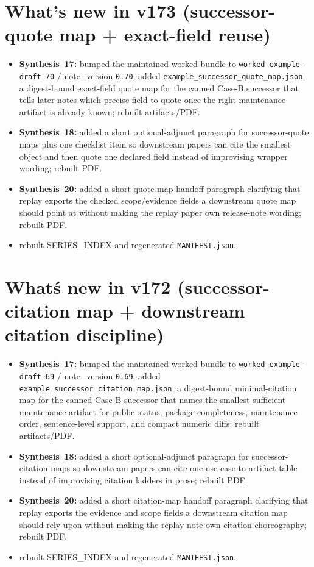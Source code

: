 \documentclass[11pt]{article}
\begin{document}
\section{What's new in v173 (successor-quote map + exact-field reuse)}
\begin{itemize}[leftmargin=*]
\item \textbf{Synthesis~17:} bumped the maintained worked bundle to \texttt{worked-example-draft-70} / note\_version \texttt{0.70}; added \texttt{example\_successor\_quote\_map.json}, a digest-bound exact-field quote map for the canned Case-B successor that tells later notes which precise field to quote once the right maintenance artifact is already known; rebuilt artifacts/PDF.
\item \textbf{Synthesis~18:} added a short optional-adjunct paragraph for successor-quote maps plus one checklist item so downstream papers can cite the smallest object and then quote one declared field instead of improvising wrapper wording; rebuilt PDF.
\item \textbf{Synthesis~20:} added a short quote-map handoff paragraph clarifying that replay exports the checked scope/evidence fields a downstream quote map should point at without making the replay paper own release-note wording; rebuilt PDF.
\item rebuilt SERIES\_INDEX and regenerated \texttt{MANIFEST.json}.
\end{itemize}

\section{What\'s new in v172 (successor-citation map + downstream citation discipline)}
\begin{itemize}[leftmargin=*]
\item \textbf{Synthesis~17:} bumped the maintained worked bundle to \texttt{worked-example-draft-69} / note\_version \texttt{0.69}; added \texttt{example\_successor\_citation\_map.json}, a digest-bound minimal-citation map for the canned Case-B successor that names the smallest sufficient maintenance artifact for public status, package completeness, maintenance order, sentence-level support, and compact numeric diffs; rebuilt artifacts/PDF.
\item \textbf{Synthesis~18:} added a short optional-adjunct paragraph for successor-citation maps so downstream papers can cite one use-case-to-artifact table instead of improvising citation ladders in prose; rebuilt PDF.
\item \textbf{Synthesis~20:} added a short citation-map handoff paragraph clarifying that replay exports the evidence and scope fields a downstream citation map should rely upon without making the replay note own citation choreography; rebuilt PDF.
\item rebuilt SERIES\_INDEX and regenerated \texttt{MANIFEST.json}.
\end{itemize}
\end{document}
